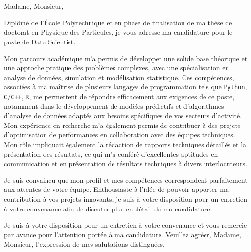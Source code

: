 \documentclass[11pt,a4paper]{lettre}
\newcommand{\python}{\texttt{Python}}
\newcommand{\ccpp}{\texttt{C}/\texttt{C++}}
\newcommand{\rr}{\texttt{R}}
\begin{document}
\begin{letter} 
{}\\
\\
\address{M. \textsc{Benane} Gaya\\
171 Avenue de Luminy\\
Logement EF38\\
13~009~\textsc{Marseille}}  

\signature{ Gaya \textsc{Benane}}
\nofax
\date{\today}

{}
\opening{\hspace{1em} Madame, Monsieur,}
\hspace{1em}
Diplômé de l'École Polytechnique et en phase de finalisation de ma thèse de doctorat en Physique des Particules, je vous adresse ma candidature pour le poste de Data Scientist.

\hspace{1em}
Mon parcours académique m'a permis de développer une solide base théorique et une approche pratique des problèmes complexes, avec une spécialisation en analyse de données, simulation et modélisation statistique. Ces compétences, associées à ma maîtrise de plusieurs langages de programmation tels que \python, \ccpp, \rr, me permettent de répondre efficacement aux exigences de ce poste, notamment dans le développement de modèles prédictifs et d'algorithmes d'analyse de données adaptés aux besoins spécifiques de vos secteurs d’activité.
Mon expérience en recherche m'a également permis de contribuer à des projets d'optimisation de performances en collaboration avec des équipes techniques. Mon rôle impliquait également la rédaction de rapports techniques détaillés et la présentation des résultats, ce qui m'a conféré d'excellentes aptitudes en communication et en présentation de résultats techniques à divers interlocuteurs.

Je suis convaincu que mon profil et mes compétences correspondent parfaitement aux attentes de votre équipe. Enthousiaste à l'idée de pouvoir apporter ma contribution à vos projets innovants, je suis à votre disposition pour un entretien à votre convenance afin de discuter plus en détail de ma candidature.
\hspace{1em}
\closing{\hspace{1em}
Je suis à votre disposition pour un entretien à votre convenance et vous remercie par avance pour l'attention portée à ma candidature.
Veuillez agréer, Madame, Monsieur, l'expression de mes salutations distinguées.
}
\end{letter}
\end{document}
